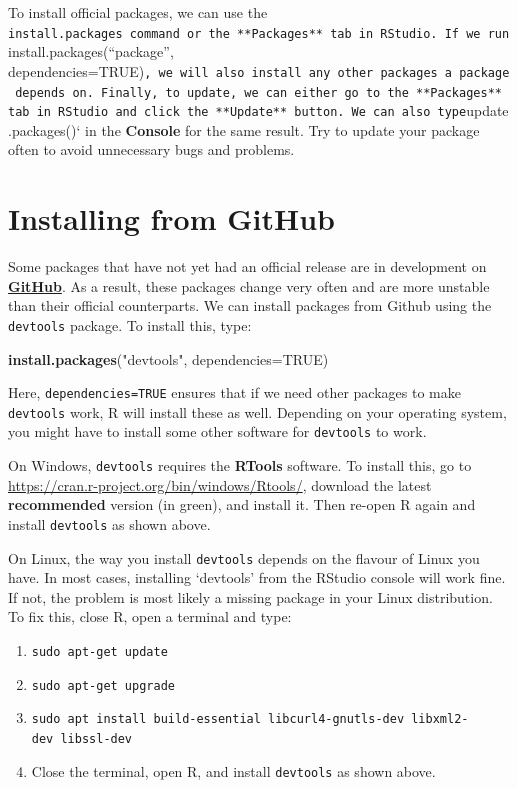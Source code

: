 \documentclass[
]{book}
\newenvironment{Shaded}{\begin{snugshade}}{\end{snugshade}}
\newcommand{\AttributeTok}[1]{\textcolor[rgb]{0.13,0.29,0.53}{#1}}
\newcommand{\ConstantTok}[1]{\textcolor[rgb]{0.56,0.35,0.01}{#1}}
\newcommand{\FunctionTok}[1]{\textcolor[rgb]{0.13,0.29,0.53}{\textbf{#1}}}
\newcommand{\NormalTok}[1]{#1}
\newcommand{\StringTok}[1]{\textcolor[rgb]{0.31,0.60,0.02}{#1}}
\providecommand{\tightlist}{%
  \setlength{\itemsep}{0pt}\setlength{\parskip}{0pt}}
\begin{document}
To install official packages, we can use the \texttt{install.packages\textquotesingle{}\ command\ or\ the\ **Packages**\ tab\ in\ RStudio.\ If\ we\ run}install.packages(``package'', dependencies=TRUE)\texttt{,\ we\ will\ also\ install\ any\ other\ packages\ a\ package\ depends\ on.\ Finally,\ to\ update,\ we\ can\ either\ go\ to\ the\ **Packages**\ tab\ in\ RStudio\ and\ click\ the\ **Update**\ button.\ We\ can\ also\ type}update.packages()` in the \textbf{Console } for the same result. Try to update your package often to avoid unnecessary bugs and problems.

\section{Installing from GitHub}\label{installing-from-github}

Some packages that have not yet had an official release are in development on \href{https://github.com/}{\textbf{GitHub}}. As a result, these packages change very often and are more unstable than their official counterparts. We can install packages from Github using the \texttt{devtools} package. To install this, type:

\begin{Shaded}
\begin{Highlighting}[]
\FunctionTok{install.packages}\NormalTok{(}\StringTok{"devtools"}\NormalTok{, }\AttributeTok{dependencies=}\ConstantTok{TRUE}\NormalTok{)}
\end{Highlighting}
\end{Shaded}

Here, \texttt{dependencies=TRUE} ensures that if we need other packages to make \texttt{devtools} work, R will install these as well. Depending on your operating system, you might have to install some other software for \texttt{devtools} to work.

On Windows, \texttt{devtools} requires the \textbf{RTools} software. To install this, go to \url{https://cran.r-project.org/bin/windows/Rtools/}, download the latest \textbf{recommended} version (in green), and install it. Then re-open R again and install \texttt{devtools} as shown above.

On Linux, the way you install \texttt{devtools} depends on the flavour of Linux you have. In most cases, installing `devtools' from the RStudio console will work fine. If not, the problem is most likely a missing package in your Linux distribution. To fix this, close R, open a terminal and type:

\begin{enumerate}
\def\labelenumi{\arabic{enumi}.}
\tightlist
\item
  \texttt{sudo\ apt-get\ update}
\item
  \texttt{sudo\ apt-get\ upgrade}
\item
  \texttt{sudo\ apt\ install\ build-essential\ libcurl4-gnutls-dev\ libxml2-dev\ libssl-dev}
\item
  Close the terminal, open R, and install \texttt{devtools} as shown above.
\end{enumerate}
\end{document}
